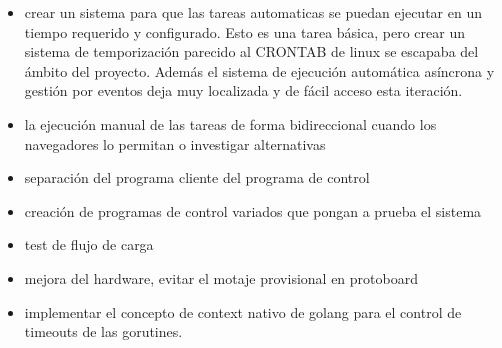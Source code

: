 \begin{itemize}
    \item crear un sistema para que las tareas automaticas se puedan ejecutar en un tiempo requerido y configurado.
    Esto es una tarea básica, pero crear un sistema de temporización parecido al CRONTAB de linux se escapaba del ámbito del proyecto.
    Además el sistema de ejecución automática asíncrona y gestión por eventos deja muy localizada y de fácil acceso esta iteración.
    \item la ejecución manual de las tareas de forma bidireccional cuando los navegadores lo permitan o investigar alternativas
    \item separación del programa cliente del programa de control
    \item creación de programas de control variados que pongan a prueba el sistema
    \item test de flujo de carga
    \item mejora del hardware, evitar el motaje provisional en protoboard
    \item implementar el concepto de context nativo de golang para el control de timeouts de las gorutines.
\end{itemize}
